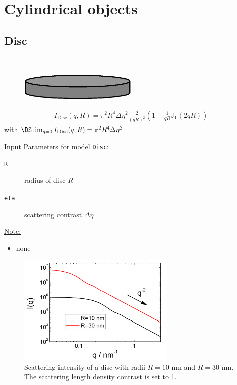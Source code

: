 \clearpage
\section{Cylindrical objects}
\label{sect:CylindricalObjects}

\subsection{Disc}
\label{sect:Disc}
\hspace{1pt} \\

\begin{figure}[htb]
\begin{center}
\includegraphics[width=0.5\textwidth]{../images/form_factor/cylindrical_obj/disc.png}
\end{center}
\caption{} \label{disc}
\end{figure}
\begin{align}
I_\text{Disc}(q,R)=\pi^2R^4\Delta\eta^2\frac{2}{(qR)^2}
\left(1-\frac{1}{qR}\text{J}_1(2qR)\right)
\end{align}
with $\DS \lim_{q=0}I_\text{Disc}(q,R) = \pi^2R^4\Delta\eta^2$

\vspace{5mm}

\underline{Input Parameters for model \texttt{Disc}:}
\begin{description}
\item[\texttt{R}] radius of disc $R$
\item[\texttt{eta}] scattering contrast $\Delta\eta$
\end{description}

\noindent\underline{Note:}
\begin{itemize}
\item none
\end{itemize}

\begin{figure}[htb]
\begin{center}
\includegraphics[width=0.668\textwidth]{../images/form_factor/cylindrical_obj/DiscIQ.png}
\end{center}
\caption{Scattering intensity of a disc with radii $R=10$ nm and $R=30$ nm.
The scattering length density contrast is set to 1.}
\label{fig:I_disc}
\end{figure}

